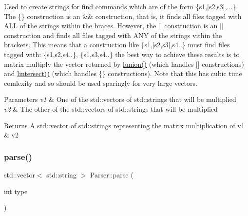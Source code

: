 Used to create strings for \textquotesingle{}find\textquotesingle{} commands which are of the form \textquotesingle{}\{s1,\mbox{[}s2,s3\mbox{]},...\}\textquotesingle{}. The \textquotesingle{}\{\}\textquotesingle{} construction is an \&\& construction, that is, it finds all files tagged with A\+LL of the strings within the braces. However, the \textquotesingle{}\mbox{[}\mbox{]}\textquotesingle{} construction is an $\vert$$\vert$ construction and finds all files tagged with A\+NY of the strings vithin the brackets. This means that a construction like \textquotesingle{}\{s1,\mbox{[}s2,s3\mbox{]},s4..\}\textquotesingle{} must find files tagged with\+: \{s1,s2,s4..\}, \{s1,s3,s4..\} the best way to achieve these results is to matrix multiply the vector returned by \mbox{\hyperlink{class_parser_ac786ab202a25c76a069e124d1bdaa780}{lunion()}} (which handles \textquotesingle{}\mbox{[}\mbox{]}\textquotesingle{} constructions) and \mbox{\hyperlink{class_parser_af09e013dcba70865bdff465a7dafba6a}{lintersect()}} (which handles \textquotesingle{}\{\}\textquotesingle{} constructions). Note that this has cubic time comlexity and so should be used sparingly for very large vectors.


\begin{DoxyParams}{Parameters}
{\em v1} & One of the std\+::vector\textquotesingle{}s of std\+::string\textquotesingle{}s that will be multiplied \\
\hline
{\em v2} & The other of the std\+::vector\textquotesingle{}s of std\+::string\textquotesingle{}s that will be multiplied\\
\hline
\end{DoxyParams}
\begin{DoxyReturn}{Returns}
A std\+::vector of std\+::string\textquotesingle{}s representing the matrix multiplication of v1 \& v2 
\end{DoxyReturn}
\mbox{\label{class_parser_a5b531e9ed867eeb8ccb9cb088cf35c24}} 
\subsubsection{\texorpdfstring{parse()}{parse()}}
{\footnotesize\ttfamily std\+::vector$<$ std\+::string $>$ Parser\+::parse (\begin{DoxyParamCaption}\item[{int}]{type }\end{DoxyParamCaption})}



